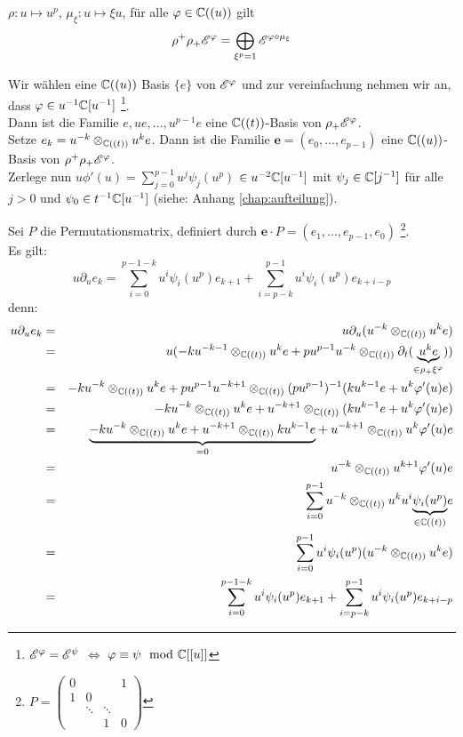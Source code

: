 \begin{lem}
  $\rho:u\mapsto u^p$,
  $\mu_\xi:u\mapsto\xi u$,
  für alle $\varphi \in {\mathbb C}((u))$ gilt
  $$ \rho^+\rho_+{\mathscr E}^\varphi=\bigoplus_{\xi^p=1}{\mathscr E}^{\varphi\circ\mu_\xi} $$
\end{lem}


Wir wählen eine ${\mathbb C}((u))$ Basis $\{e\}$ von ${\mathscr E}^\varphi$ und zur
vereinfachung nehmen wir an, dass $\varphi\in u^{-1}{\mathbb C}[u^{-1}]$
\footnote{${\mathscr E}^\varphi={\mathscr E}^\psi$ $\Leftrightarrow$ $\varphi\equiv\psi\mod{{\mathbb C}}[[u]]$}.\\
Dann ist die Familie $e,ue,...,u^{p-1}e$ eine ${\mathbb C}((t))$-Basis von
$\rho_+{\mathscr E}^\varphi$.\\
Setze $e_k=u^{-k}\otimes_{{\mathbb C}((t))}u^ke$.
Dann ist die Familie $\mathbf{e}=(e_0,...,e_{p-1})$ eine ${\mathbb C}((u))$-Basis von
$\rho^+\rho_+{\mathscr E}^\varphi$.\\
Zerlege nun $u\phi'(u)=\sum_{j=0}^{p-1}u^j\psi_j(u^p)$ $\in u^{-2}{\mathbb C}[u^{-1}]$ 
mit $\psi_j\in{\mathbb C}[j^{-1}]$ für alle $j>0$ und $\psi_0\in t^{-1}{\mathbb C}[u^{-1}]$
(siehe: Anhang \ref{chap:aufteilung}).

Sei $P$ die Permutationsmatrix, definiert durch
$\mathbf{e}\cdot P=(e_1,...,e_{p-1},e_0)$
\footnote{$P=\begin{pmatrix}0 &  &  & 1\\
1 & 0\\
 & \ddots & \ddots\\
 &  & 1 & 0
\end{pmatrix}$}.\\
Es gilt:\\
$$ u\partial_ue_k= \sum_{i=0}^{p-1-k}u^i\psi_i(u^p)e_{k+1} +
\sum_{i=p-k}^{p-1}u^i\psi_i(u^p)e_{k+i-p} $$
denn:\\
\begin{eqnarray*}
  u\partial_ue_k & = & u\partial_u(u^{-k}\otimes_{{\mathbb C}((t))}u^ke)\\
  & = & u(-ku^{-k-1}\otimes_{{\mathbb C}((t))}u^ke +
    pu^{p-1}u^{-k}\otimes_{{\mathbb C}((t))}\partial_t
    (\underset{\in\rho_+\xi^\varphi}{\underbrace{u^ke}}))\\
  & = & -ku^{-k}\otimes_{{\mathbb C}((t))}u^ke +
    pu^{p-1}u^{-k+1}\otimes_{{\mathbb C}((t))}(pu^{p-1})^{-1} (ku^{k-1}e 
    + u^k\varphi'(u)e)\\
  & = & -ku^{-k}\otimes_{{\mathbb C}((t))}u^ke +
    u^{-k+1}\otimes_{{\mathbb C}((t))}(ku^{k-1}e + u^k\varphi'(u)e)\\
  & = & \underset{=0}{\underbrace{-ku^{-k}\otimes_{{\mathbb C}((t))}u^ke +
    u^{-k+1}\otimes_{{\mathbb C}((t))}ku^{k-1}e}} +
    u^{-k+1}\otimes_{{\mathbb C}((t))}u^k\varphi'(u)e\\
  & = & u^{-k}\otimes_{{\mathbb C}((t))}u^{k+1}\varphi'(u)e\\
  & = & \sum_{i=0}^{p-1}u^{-k}\otimes_{{\mathbb C}((t))}
    u^{k}u^i\underset{\in{\mathbb C}((t))}{\underbrace{\psi_i(u^p)}}e\\
  & = & \sum_{i=0}^{p-1}u^i\psi_i(u^p)(u^{-k}\otimes_{{\mathbb C}((t))} u^{k}e)\\
  & = & \sum_{i=0}^{p-1-k}u^i\psi_i(u^p)e_{k+1} +
  \sum_{i=p-k}^{p-1}u^i\psi_i(u^p)e_{k+i-p}
\end{eqnarray*}

